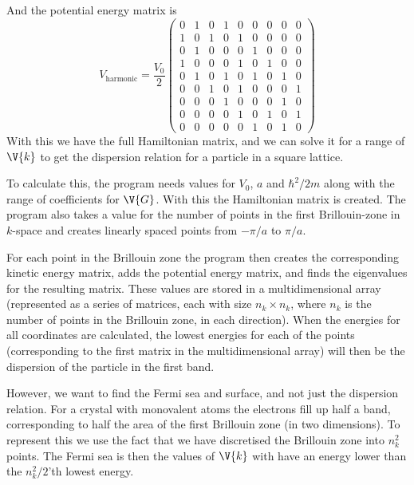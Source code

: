 \documentclass[main.tex]{subfiles}
\begin{document}
	And the potential energy matrix is
	\begin{equation}
		V_{\text{harmonic}} = \frac{V_0}{2} \begin{pmatrix}
		0 & 1 & 0 & 1 & 0 & 0 & 0 & 0 & 0 \\
		1 & 0 & 1 & 0 & 1 & 0 & 0 & 0 & 0 \\
		0 & 1 & 0 & 0 & 0 & 1 & 0 & 0 & 0 \\
		1 & 0 & 0 & 0 & 1 & 0 & 1 & 0 & 0 \\
		0 & 1 & 0 & 1 & 0 & 1 & 0 & 1 & 0 \\
		0 & 0 & 1 & 0 & 1 & 0 & 0 & 0 & 1 \\
		0 & 0 & 0 & 1 & 0 & 0 & 0 & 1 & 0 \\
		0 & 0 & 0 & 0 & 1 & 0 & 1 & 0 & 1 \\
		0 & 0 & 0 & 0 & 0 & 1 & 0 & 1 & 0
		\end{pmatrix}
	\end{equation}
	With this we have the full Hamiltonian matrix, and we can solve it for a range of $ \V{k} $ to get the dispersion relation for a particle in a square lattice.
	
	To calculate this, the program needs values for $ V_0 $, $ a $ and $ \hbar^2/2m $ along with the range of coefficients for $ \V{G} $. With this the Hamiltonian matrix is created. The program also takes a value for the number of points in the first Brillouin-zone in $ k $-space and creates linearly spaced points from $ -\pi/a $ to $ \pi/a $.
	
	For each point in the Brillouin zone the program then creates the corresponding kinetic energy matrix, adds the potential energy matrix, and finds the eigenvalues for the resulting matrix. These values are stored in a multidimensional array (represented as a series of matrices, each with size $ n_k \times n_k $, where $ n_k $ is the number of points in the Brillouin zone, in each direction). When the energies for all coordinates are calculated, the lowest energies for each of the points (corresponding to the first matrix in the multidimensional array) will then be the dispersion of the particle in the first band.
	
	However, we want to find the Fermi sea and surface, and not just the dispersion relation. For a crystal with monovalent atoms the electrons fill up half a band, corresponding to half the area of the first Brillouin zone (in two dimensions). To represent this we use the fact that we have discretised the Brillouin zone into $ n_k^2 $ points. The Fermi sea is then the values of $ \V{k} $ with have an energy lower than the $ n_k^2/2 $'th lowest energy.
	
\end{document}
